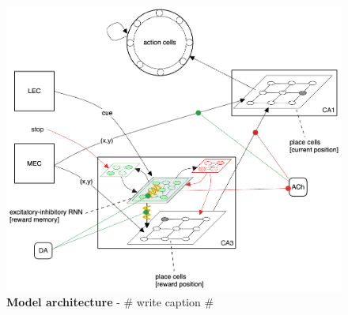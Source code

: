 \begin{figure}[ht]
    \centering
    \includegraphics[scale=0.25]{figures/model_architecture.png} 
    \caption{\textbf{Model architecture} - \# write caption \#}
    \label{fig:model_3}
\end{figure}

